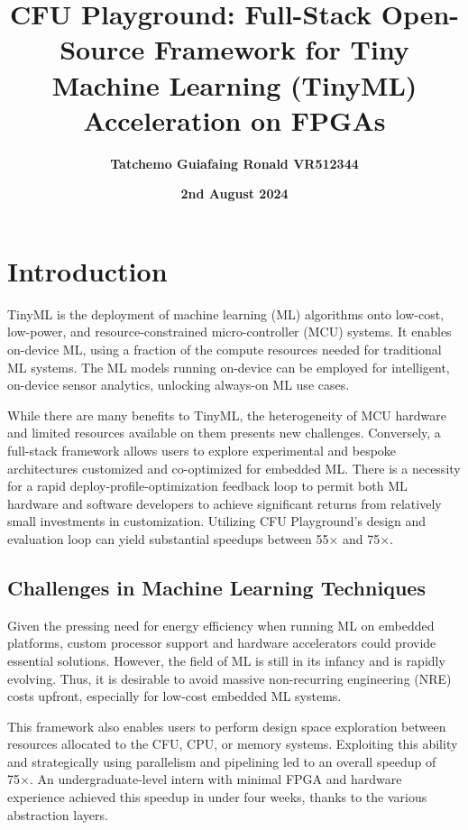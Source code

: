 \documentclass{article}
\title{\textbf{CFU Playground: Full-Stack Open-Source Framework for Tiny Machine Learning (TinyML) Acceleration on FPGAs}}
\author{\textbf{Tatchemo Guiafaing Ronald VR512344}}
\date{\textbf{2nd August 2024}}
\begin{document}

\justifying

\maketitle

\section{Introduction}

TinyML is the deployment of machine learning (ML) algorithms onto low-cost, low-power, and resource-constrained micro-controller (MCU) systems. It enables on-device ML, using a fraction of the compute resources needed for traditional ML systems. The ML models running on-device can be employed for intelligent, on-device sensor analytics, unlocking always-on ML use cases. 

While there are many benefits to TinyML, the heterogeneity of MCU hardware and limited resources available on them presents new challenges. Conversely, a full-stack framework allows users to explore experimental and bespoke architectures customized and co-optimized for embedded ML. There is a necessity for a rapid deploy-profile-optimization feedback loop to permit both ML hardware and software developers to achieve significant returns from relatively small investments in customization. Utilizing CFU Playground’s design and evaluation loop can yield substantial speedups between 55× and 75×.

\subsection{Challenges in Machine Learning Techniques}

Given the pressing need for energy efficiency when running ML on embedded platforms, custom processor support and hardware accelerators could provide essential solutions. However, the field of ML is still in its infancy and is rapidly evolving. Thus, it is desirable to avoid massive non-recurring engineering (NRE) costs upfront, especially for low-cost embedded ML systems.

This framework also enables users to perform design space exploration between resources allocated to the CFU, CPU, or memory systems. Exploiting this ability and strategically using parallelism and pipelining led to an overall speedup of 75×. An undergraduate-level intern with minimal FPGA and hardware experience achieved this speedup in under four weeks, thanks to the various abstraction layers.
\end{document}

